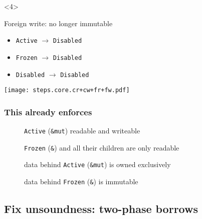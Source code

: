 \begin{frame}[t]
    \begin{onlyenv}<4>
        \begin{block}{Foreign write: no longer immutable}
            \begin{itemize}
                \item \texttt{Active} \(\to\) \texttt{Disabled}
                \item \texttt{Frozen} \(\to\) \texttt{Disabled}
                \item \texttt{Disabled} \(\to\) \texttt{Disabled}
            \end{itemize}
        \end{block}
        \texttt{[image: steps.core.cr+cw+fr+fw.pdf]}
    \end{onlyenv}
\end{frame}

\begin{frame}
    \frametitle{This already enforces}
    \begin{description}
        \item[\cmark] \texttt{Active} (\texttt{\&mut}) readable and writeable
        \item[\cmark] \texttt{Frozen} (\texttt{\&}) and all their children are only readable
        \item[\cmark] data behind \texttt{Active} (\texttt{\&mut}) is owned exclusively
        \item[\cmark] data behind \texttt{Frozen} (\texttt{\&}) is immutable
    \end{description}
\end{frame}

\subsection{Fix unsoundness: two-phase borrows}

